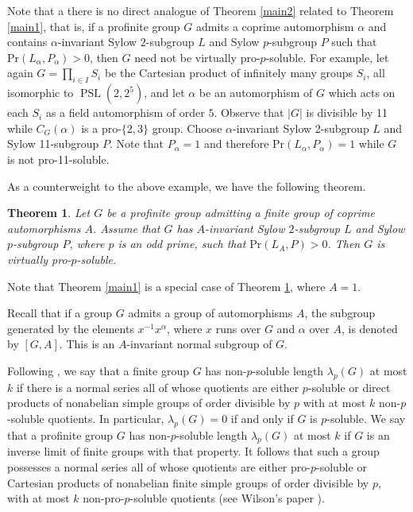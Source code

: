\documentclass[12pt]{amsart}
\newtheorem{theorem}{\bf Theorem}[section]
\newcommand{\al }{\alpha }
\newcommand{\pr }{\mathrm{Pr} }
\DeclareMathOperator{\PSL}{PSL}
\begin{document}
Note that a there is no direct analogue of Theorem \ref{main2} related to Theorem \ref{main1}, that is, if a profinite group $G$ admits a coprime automorphism $\al$ and contains $\al$-invariant Sylow $2$-subgroup $L$ and Sylow $p$-subgroup $P$ such that $\pr(L_\al,P_\al)>0$, then $G$ need not be virtually pro-$p$-soluble. For example, let again $G=\prod_{i\in I} S_i$ be the Cartesian product of infinitely many groups $S_i$, all isomorphic to $\PSL(2,2^5)$, and let $\alpha$ be an automorphism of $G$ which acts on each $S_i$ as  a field automorphism  of order $5$. 
Observe that $|G|$ is divisible by 11 while $C_G(\al)$ is a pro-$\{2,3\}$ group. Choose $\al$-invariant Sylow 2-subgroup $L$ and Sylow 11-subgroup $P$. Note that $P_\al=1$ and therefore $\pr(L_\al,P_\al)=1$ while $G$ is not pro-11-soluble.

As a counterweight to the above example, we have the following theorem.

\begin{theorem}\label{main3}
Let $G$ be a profinite group admitting a finite group of coprime automorphisms $A$. Assume that $G$ has $A$-invariant Sylow $2$-subgroup $L$ and Sylow $p$-subgroup $P$, where $p$ is an odd prime,  such that $\pr(L_A,P)>0$. Then $G$ is virtually pro-$p$-soluble.  
\end{theorem} 

Note that Theorem \ref{main1} is a special case of  Theorem \ref{main3}, where $A=1$. 

Recall that if a group $G$ admits a group of automorphisms $A$, the subgroup generated by the elements $x^{-1}x^\al$, where $x$ runs over $G$ and $\al$ over $A$, is denoted by $[G,A]$. This is an $A$-invariant normal subgroup of $G$. 

Following \cite{KhSh15}, we say that a finite group $G$ has non-$p$-soluble length $\lambda_p(G)$ at most $k$ if there is a normal series all of whose quotients are either $p$-soluble or direct products of nonabelian simple groups of order divisible by $p$ with at most $k$ non-$p$-soluble quotients. In particular, $\lambda_p(G)=0$ if and only if $G$ is $p$-soluble. We say that a profinite group $G$ has non-$p$-soluble length $\lambda_p(G)$ at most $k$ if $G$ is an inverse limit of finite groups with that property. It follows that 
such a group possesses a normal series all of whose quotients are either pro-$p$-soluble or Cartesian products of nonabelian finite simple groups of order divisible by $p,$ with at most $k$ non-pro-$p$-soluble quotients (see Wilson's paper \cite{Wilson}).
\end{document}
